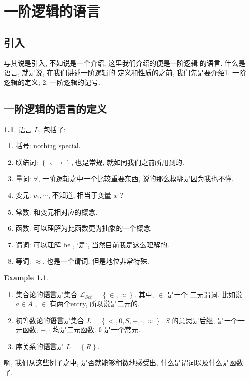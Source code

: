 \documentclass[a4paper, 12pt]{ctexbook} %
\theoremstyle{plain}
\theoremstyle{definition}
\newtheorem{example}{\llap{$\bigstar$}\space Example}
\newtheorem{definition}{\llap{Definition}\space}[section]
\theoremstyle{remark}
\begin{document}
\tableofcontents
\chapter{一阶逻辑的语言}
\section{引入}
与其说是引入, 不如说是一个介绍, 这里我们介绍的便是一阶逻辑
的语言. 什么是语言, 就是说, 在我们讲述一阶逻辑的
定义和性质的之前, 我们先是要介绍1. 一阶逻辑的定义; 2. 一阶逻辑的记号. 

\section{一阶逻辑的语言的定义}
\begin{definition}
语言 $L$, 包括了:
\begin{enumerate}
    \item 括号: nothing special. 
    \item 联结词: $\left\{\neg , \rightarrow\right\}$, 也是常规, 就如同我们之前所用到的. 
    \item 量词: $\forall $, 一阶逻辑之中一个比较重要东西, 说的那么模糊是因为我也不懂. 
    \item 变元: $v_{1}, \cdots $, 不知道, 相当于变量 $x$ ? 
    \item 常数: 和变元相对应的概念. 
    \item 函数: 可以理解为比函数更为抽象的一个概念. 
    \item 谓词: 可以理解 be , `是', 当然目前我是这么理解的. 
    \item 等词: $\approx$, 也是一个谓词, 但是地位非常特殊.
\end{enumerate}
\end{definition}
\begin{example}
\begin{enumerate}
    \item 集合论的\textbf{语言}是集合 $\mathcal L _{Set} = \left\{\in , \approx\right\}$. 其中, $\in$ 是一个
    二元谓词. 比如说 $a \in A$ , $\in$ 有两个entry, 所以说是二元的. 
    \item 初等数论的\textbf{语言}是集合 $L = \left\{< , 0 , S , + , \cdot , \approx\right\}$. 
    $S$ 的意思是后继, 是一个一元函数, $+, \cdot$ 均是二元函数. $0$ 是一个常元.
    \item 序关系的\textbf{语言}是 $L  = \left\{R\right\}$. 
\end{enumerate}
\end{example}
啊, 我们从这些例子之中, 是否就能够稍微地感受出, 什么是谓词以及什么是函数了. 
\end{document}
